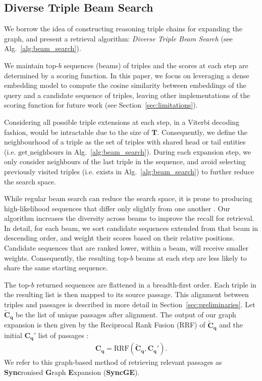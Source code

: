 \subsection{Diverse Triple Beam Search}

We borrow the idea of constructing reasoning triple chains \cite{Fang2024} for expanding the graph, and present a retrieval algorithm: \textit{Diverse Triple Beam Search} (see Alg.~\ref{alg:beam_search}). 

We maintain top-$b$ sequences (beams) of triples and the scores at each step are determined by a scoring function. In this paper, we focus on leveraging a dense embedding model to compute the cosine similarity between embeddings of the query and a candidate sequence of triples, leaving other implementations of the scoring function for future work (see Section~\ref{sec:limitations}).

Considering all possible triple extensions at each step, in a Viterbi decoding fashion, would be intractable due to the size of $\mathbf{T}$. Consequently, we define the neighbourhood of a triple as the set of triples with shared head or tail entities (i.e. $\mathrm{get\_neighbours}$ in Alg.~\ref{alg:beam_search}). During each expansion step, we only consider neighbours of the last triple in the sequence, and avoid selecting previously visited triples (i.e. $\mathrm{exists}$ in Alg.~\ref{alg:beam_search}) to further reduce the search space.

While regular beam search can reduce the search space, it is prone to producing high-likelihood sequences that differ only slightly from one another \cite{Ippolito2019, Vijayakumar2018}. Our algorithm increases the diversity across beams to improve the recall for retrieval. In detail, for each beam, we sort candidate sequences extended from that beam in descending order, and weight their scores based on their relative positions. Candidate sequences that are ranked lower, within a beam, will receive smaller weights. Consequently, the resulting top-$b$ beams at each step are less likely to share the same starting sequence. 

The top-$b$ returned sequences are flattened in a breadth-first order. Each triple in the resulting list is then mapped to its source passage. This alignment between triples and passages is described in more detail in Section~\ref{sec:preliminaries}. Let $\widetilde{\mathbf{C}}_\mathbf{q}$ be the list of unique passages after alignment. The output of our graph expansion is then given by the Reciprocal Rank Fusion (RRF) \cite{Cormack2009} of $\widetilde{\mathbf{C}}_\mathbf{q}$ and the initial $\mathbf{C}_\mathbf{q}'$ list of passages :
\begin{align}
    \mathbf{C}_{\mathbf{q}} = \mathrm{RRF}\left(\widetilde{\mathbf{C}}_\mathbf{q}, \mathbf{C}_\mathbf{q}'\right ).
\end{align}
We refer to this graph-based method of retrieving relevant passages as \textbf{Sync}ronised \textbf{G}raph \textbf{E}xpansion (\textbf{SyncGE}).


